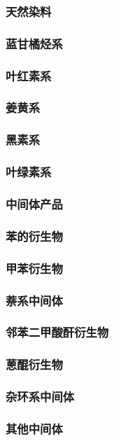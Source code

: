 \documentclass[UTF8]{../../ApplicationUniverse}
\begin{document}
\subsubsection{天然染料}
    \subsubsection{蓝甘橘烃系}
    \subsubsection{叶红素系}
    \subsubsection{姜黄系}
    \subsubsection{黑素系}
    \subsubsection{叶绿素系}
\subsubsection{中间体产品}
    \subsubsection{苯的衍生物}
    \subsubsection{甲苯衍生物}
    \subsubsection{萘系中间体}
    \subsubsection{邻苯二甲酸酐衍生物}
    \subsubsection{蒽醌衍生物}
    \subsubsection{杂环系中间体}
    \subsubsection{其他中间体}
\end{document}
